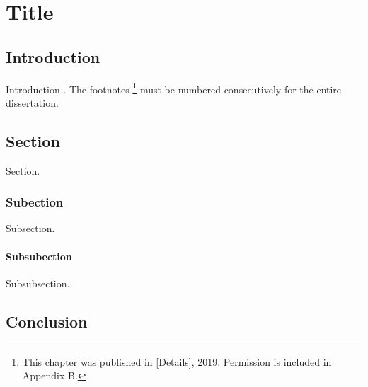 \chapter{Title}
\section{Introduction}
Introduction \cite{first}. The footnotes \footnote[1]{This chapter was published in [Details], 2019. Permission is included in Appendix B.} must be numbered consecutively for the entire dissertation. 





\section{Section}
Section.

\subsection{Subection}
Subsection.
\subsubsection{Subsubection}
Subsubsection.



\section{Conclusion}

